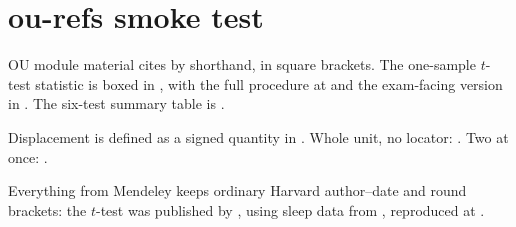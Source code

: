 \documentclass[a4paper,11pt]{article}
\begin{document}
\section*{ou-refs smoke test}

OU module material cites by shorthand, in square brackets. The one-sample
$t$-test statistic is boxed in , with the
full procedure at  and the exam-facing
version in . The six-test summary table
is .

Displacement is defined as a signed quantity in
. Whole unit, no locator:
. Two at once: .

Everything from Mendeley keeps ordinary Harvard author--date and round
brackets: the $t$-test was published by \textcite{gosset1908}, using sleep
data from \textcite{cushny1905}, reproduced at .

\printbibliography[title={References}]
\end{document}
